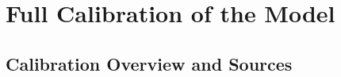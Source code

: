 \documentclass[12pt,3p,authoryear,review]{elsarticle}
\begin{document}
\pagebreak%
\section{Full Calibration of the Model}\label{sec:appendix_calibration}%
\subsection{Calibration Overview and Sources}%
\end{document}

